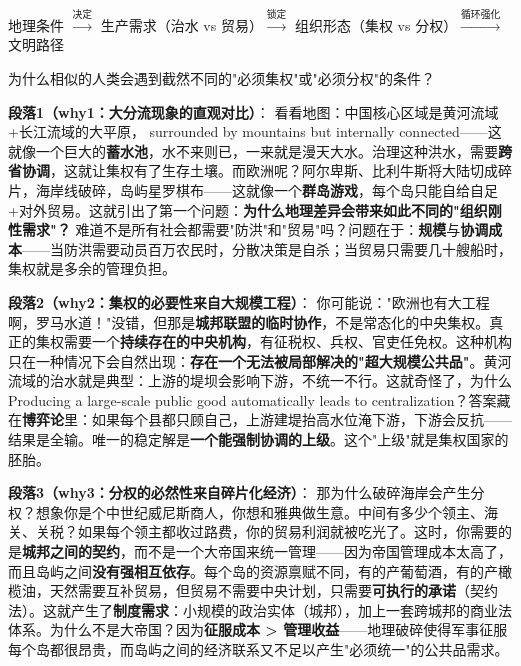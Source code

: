 \documentclass[../main.tex]{subfiles}
\begin{document}
	\begin{logicmap}
		地理条件 $\xrightarrow{\text{决定}}$ 生产需求（治水 vs 贸易）$\xrightarrow{\text{锁定}}$ 组织形态（集权 vs 分权）$\xrightarrow{\text{循环强化}}$ 文明路径
	\end{logicmap}
	
	\begin{questionbox}
		为什么相似的人类会遇到截然不同的"必须集权"或"必须分权"的条件？
	\end{questionbox}
	
	\textbf{段落1（why1：大分流现象的直观对比）}：  
	看看地图：中国核心区域是黄河流域+长江流域的大平原， surrounded by mountains but internally connected——这就像一个巨大的\textbf{蓄水池}，水不来则已，一来就是漫天大水。治理这种洪水，需要\textbf{跨省协调}，这就让集权有了生存土壤。而欧洲呢？阿尔卑斯、比利牛斯将大陆切成碎片，海岸线破碎，岛屿星罗棋布——这就像一个\textbf{群岛游戏}，每个岛只能自给自足+对外贸易。这就引出了第一个问题：\textbf{为什么地理差异会带来如此不同的"组织刚性需求"？} 难道不是所有社会都需要"防洪"和"贸易"吗？问题在于：\textbf{规模}与\textbf{协调成本}——当防洪需要动员百万农民时，分散决策是自杀；当贸易只需要几十艘船时，集权就是多余的管理负担。
	
	\textbf{段落2（why2：集权的必要性来自大规模工程）}：  
	你可能说："欧洲也有大工程啊，罗马水道！"没错，但那是\textbf{城邦联盟的临时协作}，不是常态化的中央集权。真正的集权需要一个\textbf{持续存在的中央机构}，有征税权、兵权、官吏任免权。这种机构只在一种情况下会自然出现：\textbf{存在一个无法被局部解决的"超大规模公共品"}。黄河流域的治水就是典型：上游的堤坝会影响下游，不统一不行。这就奇怪了，为什么 Producing a large-scale public good automatically leads to centralization？答案藏在\textbf{博弈论}里：如果每个县都只顾自己，上游建堤抬高水位淹下游，下游会反抗——结果是全输。唯一的稳定解是\textbf{一个能强制协调的上级}。这个"上级"就是集权国家的胚胎。
	
	\textbf{段落3（why3：分权的必然性来自碎片化经济）}：  
	那为什么破碎海岸会产生分权？想象你是个中世纪威尼斯商人，你想和雅典做生意。中间有多少个领主、海关、关税？如果每个领主都收过路费，你的贸易利润就被吃光了。这时，你需要的是\textbf{城邦之间的契约}，而不是一个大帝国来统一管理——因为帝国管理成本太高了，而且岛屿之间\textbf{没有强相互依存}。每个岛的资源禀赋不同，有的产葡萄酒，有的产橄榄油，天然需要互补贸易，但贸易不需要中央计划，只需要\textbf{可执行的承诺}（契约法）。这就产生了\textbf{制度需求}：小规模的政治实体（城邦），加上一套跨城邦的商业法体系。为什么不是大帝国？因为\textbf{征服成本 > 管理收益}——地理破碎使得军事征服每个岛都很昂贵，而岛屿之间的经济联系又不足以产生"必须统一"的公共品需求。
	
\end{document}
